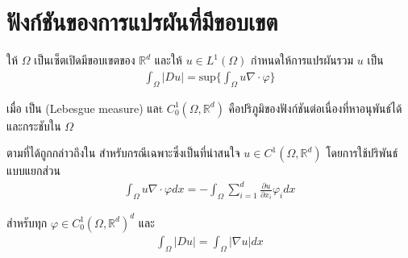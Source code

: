\section{ฟังก์ชันของการแปรผันที่มีขอบเขต}
ให้ $\Omega$ เป็นเซ็ตเปิดมีขอบเขตของ $ \mathbb{R}^{d}$ และให้ $u \in L^{1}(\Omega)$ กำหนดให้การแปรผันรวม $u$ เป็น
\begin{align} 
    \int_{\Omega} |Du| = \text{sup} \Big\{ \int_\Omega u \nabla \cdot \varphi \Big\}
\end{align}

เมื่อ  เป็น (Lebesgue measure) แลt $C_0^1 ( \Omega , \mathbb{R}^d)$ คือปริภูมิของฟังก์ชันต่อเนื่องที่หาอนุพันธ์ได้และกระชับใน $\Omega$

\hspace{1cm} ตามที่ได้ถูกกล่าวถึงใน \cite{ref:bounded_variation} สำหรับกรณีเฉพาะซึ่งเป็นที่น่าสนใจ $u \in C^1 (\Omega, \mathbb{R}^d )$ โดยการใช้ปริพันธ์แบบแยกส่วน
\begin{align}
    \int_\Omega u \nabla \cdot \varphi d x = - \int_\Omega \sum_{i=1}^{d} \frac{\partial u}{\partial x_i} \varphi_i d x
\end{align}

สำหรับทุก $\varphi \in C_0^1 (\Omega,\mathbb{R}^{d})^{d} $ และ
\begin{align}
    \int_\Omega | D u | = \int_\Omega | \nabla u | dx
\end{align}

